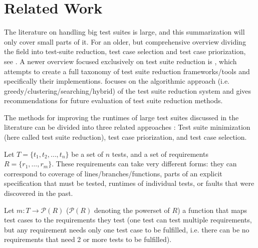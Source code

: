 
\chapter{Related Work}\label{chapter:related}


The literature on handling big test suites is large, and this
summarization will only cover small parts of it. For an older,
but comprehensive overview dividing the field into test-suite
reduction, test case selection and test case priorization, see
\cite{yoo2012regression}. A newer overview focused exclusively on test
suite reduction is \cite{khan2016survey}, which attempts to create a
full taxonomy of test suite reduction frameworks/tools and specifically
their implementions. \cite{khan2018systematic} focuses on the algorithmic
approach (i.e. greedy/clustering/searching/hybrid) of the test suite
reduction system and gives recommendations for future evaluation of test
suite reduction methods.

The methods for improving the runtimes of large test suites discussed
in the literature can be divided into three related approaches
\cite{yoo2012regression}: Test suite minimization (here called test
suite reduction), test case priorization, and test case selection.



Let $T=\{t_1, t_2, \dots, t_n\}$ be a set of $n$ tests, and a
set of requirements $R=\{r_1, \dots, r_m\}$. These requirements
can take very different forms: they can correspond to coverage of
lines/branches/functions, parts of an explicit specification that must
be tested, runtimes of individual tests, or faults that were discovered
in the past.

Let $m: T \rightarrow \mathcal{P}(R)$ ($\mathcal{P}(R)$ denoting the
powerset of $R$) a function that maps test cases to the requirements they
test (one test can test multiple requirements, but any requirement needs
only one test case to be fulfilled, i.e. there can be no requirements
that need 2 or more tests to be fulfilled).

